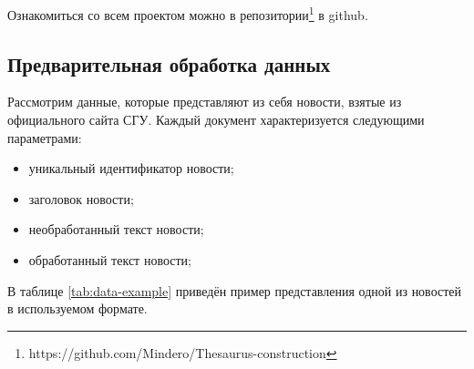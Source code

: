 \documentclass[coursework]{SCWorks}
\begin{document}
Ознакомиться со всем проектом можно в репозитории\footnote{https://github.com/Mindero/Thesaurus-construction} в github.
\subsection{Предварительная обработка данных}
Рассмотрим данные, которые представляют из себя новости, взятые из официального сайта СГУ. Каждый документ характеризуется следующими параметрами:
\begin{itemize}
  \item уникальный идентификатор новости;
  \item заголовок новости;
  \item необработанный текст новости;
  \item обработанный текст новости;
\end{itemize}

В таблице \ref{tab:data-example} приведён пример представления одной из новостей в используемом формате.
\end{document}
